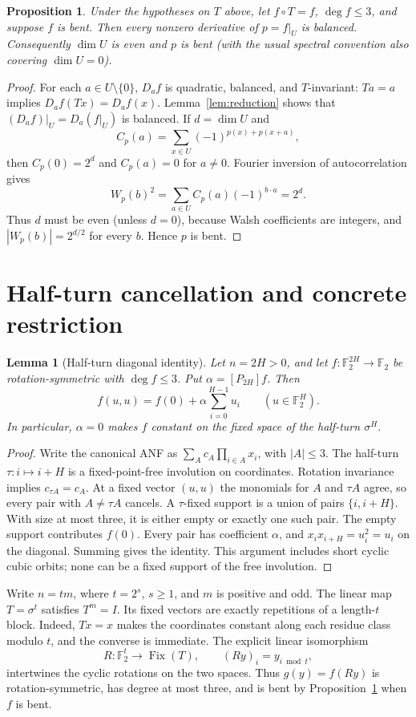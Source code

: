 \documentclass[11pt,a4paper]{article}
\newtheorem{lemma}[theorem]{Lemma}
\newtheorem{proposition}[theorem]{Proposition}
\theoremstyle{remark}
\theoremstyle{plain}
\newcommand{\F}{\mathbb F_2}
\newcommand{\Fix}{\operatorname{Fix}}
\begin{document}
\begin{proposition}\label{prop:restriction}
Under the hypotheses on $T$ above, let $f\circ T=f$, $\deg f\le3$, and suppose $f$ is bent. Then every nonzero derivative of $p=f|_U$ is balanced. Consequently $\dim U$ is even and $p$ is bent (with the usual spectral convention also covering $\dim U=0$).
\end{proposition}
\begin{proof}
For each $a\in U\setminus\{0\}$, $D_af$ is quadratic, balanced, and $T$-invariant: $Ta=a$ implies $D_af(Tx)=D_af(x)$. Lemma~\ref{lem:reduction} shows that $(D_af)|_U=D_a(f|_U)$ is balanced. If $d=\dim U$ and
\[
C_p(a)=\sum_{x\in U}(-1)^{p(x)+p(x+a)},
\]
then $C_p(0)=2^d$ and $C_p(a)=0$ for $a\ne0$. Fourier inversion of autocorrelation gives
\[
W_p(b)^2=\sum_{a\in U}C_p(a)(-1)^{b\cdot a}=2^d.
\]
Thus $d$ must be even (unless $d=0$), because Walsh coefficients are integers, and $|W_p(b)|=2^{d/2}$ for every $b$. Hence $p$ is bent.
\end{proof}

\section{Half-turn cancellation and concrete restriction}
\begin{lemma}[Half-turn diagonal identity]\label{lem:diagonal}
Let $n=2H>0$, and let $f:\F^{2H}\to\F$ be rotation-symmetric with $\deg f\le3$. Put $\alpha=[P_{2H}]f$. Then
\[
f(u,u)=f(0)+\alpha\sum_{i=0}^{H-1}u_i
\qquad(u\in\F^H).
\]
In particular, $\alpha=0$ makes $f$ constant on the fixed space of the half-turn $\sigma^H$.
\end{lemma}
\begin{proof}
Write the canonical ANF as $\sum_A c_A\prod_{i\in A}x_i$, with $|A|\le3$. The half-turn $\tau:i\mapsto i+H$ is a fixed-point-free involution on coordinates. Rotation invariance implies $c_{\tau A}=c_A$. At a fixed vector $(u,u)$ the monomials for $A$ and $\tau A$ agree, so every pair with $A\ne\tau A$ cancels. A $\tau$-fixed support is a union of pairs $\{i,i+H\}$. With size at most three, it is either empty or exactly one such pair. The empty support contributes $f(0)$. Every pair has coefficient $\alpha$, and $x_ix_{i+H}=u_i^2=u_i$ on the diagonal. Summing gives the identity. This argument includes short cyclic cubic orbits; none can be a fixed support of the free involution.
\end{proof}

Write $n=tm$, where $t=2^s$, $s\ge1$, and $m$ is positive and odd. The linear map $T=\sigma^t$ satisfies $T^m=I$. Its fixed vectors are exactly repetitions of a length-$t$ block. Indeed, $Tx=x$ makes the coordinates constant along each residue class modulo $t$, and the converse is immediate. The explicit linear isomorphism
\[
R:\F^t\longrightarrow\Fix(T),\qquad (Ry)_i=y_{i\bmod t},
\]
intertwines the cyclic rotations on the two spaces. Thus $g(y)=f(Ry)$ is rotation-symmetric, has degree at most three, and is bent by Proposition~\ref{prop:restriction} when $f$ is bent.
\end{document}
